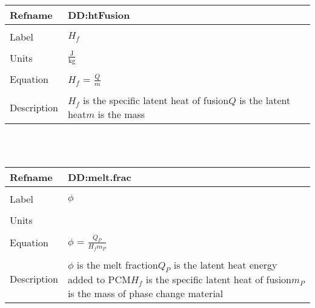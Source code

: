 \documentclass[12pt]{article}
\begin{document}
~\newline
\noindent \begin{minipage}{\textwidth}
\begin{tabular}{p{} p{}}
\toprule \textbf{Refname} & \textbf{DD:htFusion}
\label{DD:htFusion}
\\ \midrule \\
Label & $H_{f}$
\\ \midrule \\
Units & $\frac{\text{J}}{\text{kg}}$
\\ \midrule \\
Equation & $H_{f}$ = $\frac{Q}{m}$
\\ \midrule \\
Description & $H_{f}$ is the specific latent heat of fusion\newline$Q$ is the latent heat\newline$m$ is the mass
\\ \bottomrule \end{tabular}
\end{minipage}\\
~\newline
\noindent \begin{minipage}{\textwidth}
\begin{tabular}{p{} p{}}
\toprule \textbf{Refname} & \textbf{DD:melt.frac}
\label{DD:melt.frac}
\\ \midrule \\
Label & $\phi{}$
\\ \midrule \\
Units & 
\\ \midrule \\
Equation & $\phi{}$ = $\frac{Q_{P}}{H_{f}m_{P}}$
\\ \midrule \\
Description & $\phi{}$ is the melt fraction\newline$Q_{P}$ is the latent heat energy added to PCM\newline$H_{f}$ is the specific latent heat of fusion\newline$m_{P}$ is the mass of phase change material
\\ \bottomrule \end{tabular}
\end{minipage}\\
\end{document}
